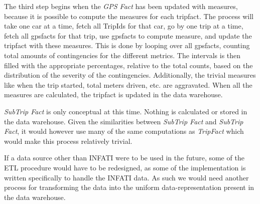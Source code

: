 The third step begins when the \textit{GPS Fact} has been updated with measures, because it is possible to compute the measures for each tripfact. The process will take one car at a time, fetch all TripIds for that car, go by one trip at a time, fetch all gpsfacts for that trip, use gpsfacts to compute measure, and update the tripfact with these measures. This is done by looping over all gpsfacts, counting total amounts of contingencies for the different metrics. The intervals is then filled with the appropriate percentages, relative to the total counts, based on the distribution of the severity of the contingencies. Additionally, the trivial measures like when the trip started, total meters driven, etc. are aggravated. When all the measures are calculated, the tripfact is updated in the data warehouse.

\textit{SubTrip Fact} is only conceptual at this time. Nothing is calculated or stored in the data warehouse. Given the similarities between \textit{SubTrip Fact} and \textit{SubTrip Fact}, it would however use many of the same computations as \textit{TripFact} which would make this process relatively trivial.

If a data source other than INFATI were to be used in the future, some of the ETL procedure would have to be redesigned, as some of the implementation is written specifically to handle the INFATI data. As such we would need another process for transforming the data into the uniform data-representation present in the data warehouse.

